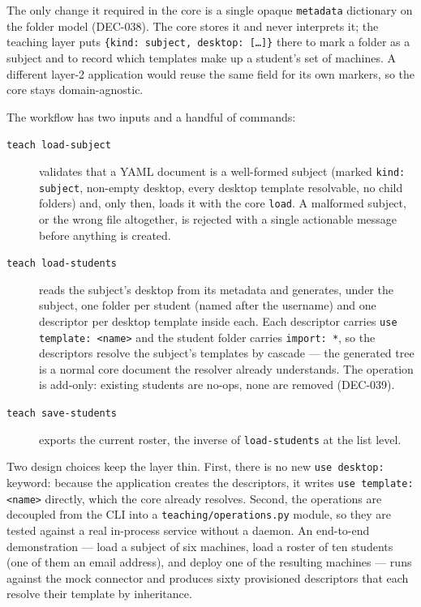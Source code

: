The only change it required in the core is a single opaque
\texttt{metadata} dictionary on the folder model (DEC-038). The core
stores it and never interprets it; the teaching layer puts
\texttt{\{kind: subject, desktop: [\dots]\}} there to mark a folder as
a subject and to record which templates make up a student's set of
machines. A different layer-2 application would reuse the same field
for its own markers, so the core stays domain-agnostic.

The workflow has two inputs and a handful of commands:

\begin{description}
  \item[\texttt{teach load-subject}] validates that a YAML document is
        a well-formed subject (marked \texttt{kind: subject},
        non-empty desktop, every desktop template resolvable, no child
        folders) and, only then, loads it with the core
        \texttt{load}. A malformed subject, or the wrong file
        altogether, is rejected with a single actionable message
        before anything is created.
  \item[\texttt{teach load-students}] reads the subject's desktop from
        its metadata and generates, under the subject, one folder per
        student (named after the username) and one descriptor per
        desktop template inside each. Each descriptor carries
        \texttt{use template: <name>} and the student folder carries
        \texttt{import: *}, so the descriptors resolve the subject's
        templates by cascade --- the generated tree is a normal core
        document the resolver already understands. The operation is
        add-only: existing students are no-ops, none are removed
        (DEC-039).
  \item[\texttt{teach save-students}] exports the current roster, the
        inverse of \texttt{load-students} at the list level.
\end{description}

Two design choices keep the layer thin. First, there is no new
\texttt{use desktop:} keyword: because the application creates the
descriptors, it writes \texttt{use template: <name>} directly, which
the core already resolves. Second, the operations are decoupled from
the CLI into a \texttt{teaching/operations.py} module, so they are
tested against a real in-process service without a daemon. An
end-to-end demonstration --- load a subject of six machines, load a
roster of ten students (one of them an email address), and deploy one
of the resulting machines --- runs against the mock connector and
produces sixty provisioned descriptors that each resolve their
template by inheritance.

